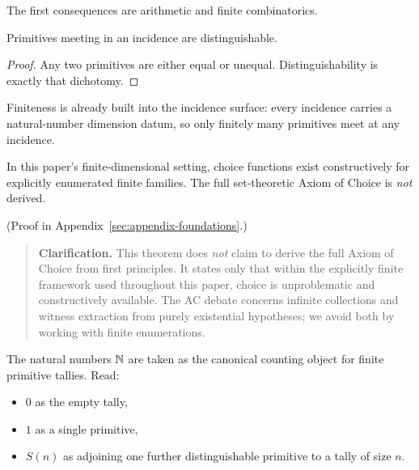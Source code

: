 The first consequences are arithmetic and finite combinatorics.

\begin{theorem}[Distinction]\label{thm:distinction}
Primitives meeting in an incidence are distinguishable.
\end{theorem}

\begin{proof}
Any two primitives are either equal or unequal. Distinguishability is exactly
that dichotomy.
\end{proof}

\begin{remark}[Finiteness]\label{rem:finiteness}
Finiteness is already built into the incidence surface: every incidence carries
a natural-number dimension datum, so only finitely many primitives meet at any
incidence.
\end{remark}

\begin{theorem}
\label{thm:choice}
In this paper's finite-dimensional setting, choice functions exist constructively for explicitly enumerated finite families. The full set-theoretic Axiom of Choice is \emph{not} derived.
\end{theorem}

(Proof in Appendix~\ref{sec:appendix-foundations}.)

\begin{quote}\small
\textbf{Clarification.} This theorem does \emph{not} claim to derive the full Axiom of Choice from first principles. It states only that within the explicitly finite framework used throughout this paper, choice is unproblematic and constructively available. The AC debate concerns infinite collections and witness extraction from purely existential hypotheses; we avoid both by working with finite enumerations.
\end{quote}

\begin{definition}\label{def:natural-numbers}
The natural numbers $\mathbb{N}$ are taken as the canonical counting object for finite primitive tallies. Read:
\begin{itemize}[itemsep=0.2em]
\item $0$ as the empty tally,
\item $1$ as a single primitive,
\item $S(n)$ as adjoining one further distinguishable primitive to a tally of size $n$.
\end{itemize}
\end{definition}

